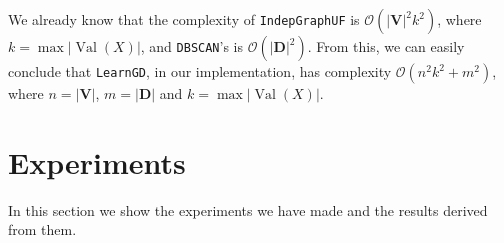 \documentclass{amsart}
\DeclareMathOperator*{\Val}{\text{Val}}
\theoremstyle{plain}
\numberwithin{equation}{section}
\newcommand{\set}[1]{\mathbf{#1}}
\newcommand{\bigo}{\mathcal{O}}
\newcommand{\code}[1]{\lstinline[mathescape=true]{#1}}
\begin{document}
We already know that the complexity of \code{IndepGraphUF} is $\bigo(|\set{V}|^2 k^2)$, where
$k=\max |\Val(X)|$, and \code{DBSCAN}'s is $\bigo(|\set{D}|^2)$. From this, we can easily conclude
that \code{LearnGD}, in our implementation, has complexity $\bigo(n^2 k^2 + m^2)$, where
$n=|\set{V}|$, $m=|\set{D}|$ and $k=\max |\Val(X)|$.

\section{Experiments}

In this section we show the experiments we have made and the results derived from them.


\newpage
\appendix

\newpage

\printbibliography[]
\end{document}
